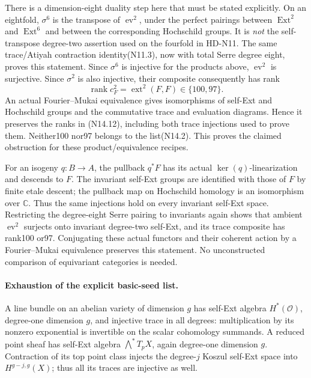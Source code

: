 There is a dimension-eight duality step here that must be
stated explicitly. On an eightfold, $\sigma^6$ is the transpose
of $\operatorname{ev}^2$, under the perfect pairings between
$\operatorname{Ext}^2$ and $\operatorname{Ext}^6$ and between
the corresponding Hochschild groups. It is \emph{not} the
self-transpose degree-two assertion used on the fourfold in
HD-N11. The same trace/Atiyah contraction identity(N11.3),
now with total Serre degree eight, proves this statement.
Since $\sigma^6$ is injective for the products above,
$\operatorname{ev}^2$ is surjective. Since $\sigma^2$ is also
injective, their composite consequently has rank
\[
 \operatorname{rank}c_F^2=\operatorname{ext}^2(F,F)
                         \in\{100,97\}.                   \tag{N14.12}
\]
An actual Fourier--Mukai equivalence gives isomorphisms of
self-Ext and Hochschild groups and the commutative trace
and evaluation diagrams. Hence it preserves the ranks in
(N14.12), including both trace injections used to prove them.
Neither100 nor97 belongs to the list(N14.2). This proves the
claimed obstruction for these product/equivalence recipes.

For an isogeny $q:B\to A$, the pullback $q^*F$ has its actual
$\ker(q)$-linearization and descends to $F$.
The invariant self-Ext groups are identified with those of
$F$ by finite etale descent; the pullback map on Hochschild
homology is an isomorphism over $\mathbb C$.
Thus the same injections hold on every invariant self-Ext
space. Restricting the degree-eight Serre pairing to invariants
again shows that ambient $\operatorname{ev}^2$ surjects onto
invariant degree-two self-Ext, and its trace composite has
rank100 or97. Conjugating these actual functors and their
coherent action by a Fourier--Mukai equivalence preserves
this statement. No unconstructed comparison of equivariant
categories is needed.

\paragraph{Exhaustion of the explicit basic-seed list.}
A line bundle on an abelian variety of dimension $g$ has
self-Ext algebra $H^*(\mathcal O)$, degree-one dimension $g$,
and injective trace in all degrees: multiplication by its
nonzero exponential is invertible on the scalar cohomology
summands. A reduced point sheaf has self-Ext algebra
$\bigwedge^*T_pX$, again degree-one dimension $g$.
Contraction of its top point class injects the degree-$j$
Koszul self-Ext space into $H^{g-j,g}(X)$; thus all its
traces are injective as well.

